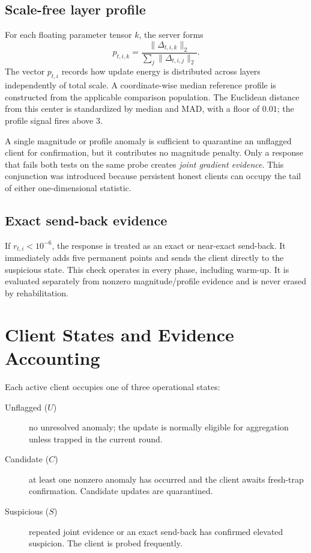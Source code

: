 \subsection{Scale-free layer profile}
For each floating parameter tensor $k$, the server forms
\begin{equation}
p_{t,i,k}=\frac{\lVert\Delta_{t,i,k}\rVert_2}
{\sum_j\lVert\Delta_{t,i,j}\rVert_2}.
\end{equation}
The vector $p_{t,i}$ records how update energy is distributed across layers independently of total scale. A coordinate-wise median reference profile is constructed from the applicable comparison population. The Euclidean distance from this center is standardized by median and MAD, with a floor of $0.01$; the profile signal fires above 3.

A single magnitude or profile anomaly is sufficient to quarantine an unflagged client for confirmation, but it contributes no magnitude penalty. Only a response that fails both tests on the same probe creates \emph{joint gradient evidence}. This conjunction was introduced because persistent honest clients can occupy the tail of either one-dimensional statistic.

\subsection{Exact send-back evidence}
If $r_{t,i}<10^{-6}$, the response is treated as an exact or near-exact send-back. It immediately adds five permanent points and sends the client directly to the suspicious state. This check operates in every phase, including warm-up. It is evaluated separately from nonzero magnitude/profile evidence and is never erased by rehabilitation.

\section{Client States and Evidence Accounting}

Each active client occupies one of three operational states:
\begin{description}
    \item[Unflagged ($U$)] no unresolved anomaly; the update is normally eligible for aggregation unless trapped in the current round.
    \item[Candidate ($C$)] at least one nonzero anomaly has occurred and the client awaits fresh-trap confirmation. Candidate updates are quarantined.
    \item[Suspicious ($S$)] repeated joint evidence or an exact send-back has confirmed elevated suspicion. The client is probed frequently.
\end{description}

